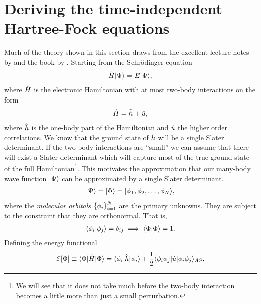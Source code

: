     \section{Deriving the time-independent Hartree-Fock equations}
        Much of the theory shown in this section draws from the excellent
        lecture notes by \citeauthor{kvaal2017notes} \cite{kvaal2017notes} and
        the book  by \citeauthor{szabo1996modern}
        \cite{szabo1996modern}.
        Starting from the Schrödinger equation
        \begin{align}
            \hat{H}| \Psi \rangle = E| \Psi \rangle,
        \end{align}
        where $\hat{H}$ is the electronic Hamiltonian with at most two-body
        interactions on the form
        \begin{align}
            \hat{H} = \hat{h} + \hat{u},
        \end{align}
        where $\hat{h}$ is the one-body part of the Hamiltonian and
        $\hat{u}$ the higher order correlations.
        We know that the ground state of $\hat{h}$ will be a single Slater
        determinant.
        If the two-body interactions are ``small'' we can assume that there will
        exist a Slater determinant which will capture most of the true ground
        state of the full Hamiltonian\footnote{We will see that it does not take
        much before the two-body interaction becomes a little more than just a
        small perturbation.}.
        This motivates the approximation that our many-body wave function
        $| \Psi \rangle$ can be approximated by a single Slater determinant.
        \begin{align}
            | \Psi \rangle = | \Phi \rangle = | \phi_1, \phi_2, \dots, \phi_N \rangle,
        \end{align}
        where the \emph{molecular orbitals} $\left\{ \phi_i \right\}_{i = 1}^{N}$ are the
        primary unknowns.
        They are subject to the constraint that they are orthonormal.
        That is,
        \begin{align}
            \langle \phi_i | \phi_j \rangle = \delta_{ij}
            \implies \langle \Phi | \Phi \rangle = 1.
        \end{align}
        Defining the energy functional
        \begin{align}
            \mathcal{E}[\Phi]
            \equiv \langle \Phi |\hat{H}| \Phi \rangle
            =
            \langle \phi_i |\hat{h}| \phi_i \rangle
            + \frac{1}{2}\langle \phi_i\phi_j |\hat{u}| \phi_i\phi_j \rangle_{AS},
            \label{eq:energy_func_hf}
        \end{align}
